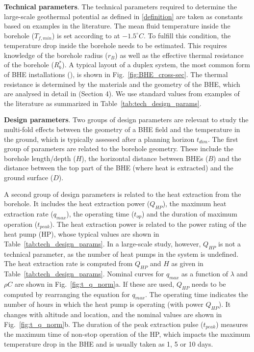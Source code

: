 \textbf{Technical parameters}. The technical parameters required to determine the large-scale geothermal potential as defined in \ref{definition} are taken as constants based on examples in the literature. The mean fluid temperature inside the borehole ($T_{f, min}$) is set according to \citet{sia_sondes_2010} at $-1.5^\circ C$. To fulfill this condition, the temperature drop inside the borehole needs to be estimated. This requires knowledge of the borehole radius ($r_B$) as well as the effective thermal resistance of the borehole ($R_b^*$). A typical layout of a duplex system, the most common form of BHE installations (\cite{sia_sondes_2010}), is shown in Fig.~\ref{fig:BHE_cross-sec}. The thermal resistance is determined by the materials and the geometry of the BHE, which are analysed in detail in \citep{huber_erdwarmesonden_2005} (Section 4). We use standard values from examples of the literature as summarized in Table~\ref{tab:tech_design_params}.

\textbf{Design parameters}. Two groups of design parameters are relevant to study the multi-fold effects between the geometry of a BHE field and the temperature in the ground, which is typically assessed after a planning horizon $t_{dim}$. 
The first group of parameters are related to the borehole geometry. These include the borehole length/depth ($H$), the horizontal distance between BHEs ($B$) and the distance between the top part of the BHE (where heat is extracted) and the ground surface ($D$). 

A second group of design parameters is related to the heat extraction from the borehole. It includes the heat extraction power ($Q_{HP}$), the maximum heat extraction rate ($q_{max}$), the operating time ($t_{op}$) and the duration of maximum operation ($t_{peak}$). The heat extraction power is related to the power rating of the heat pump (HP), whose typical values are shown in Table~\ref{tab:tech_design_params}. In a large-scale study, however, $Q_{HP}$ is not a technical parameter, as the number of heat pumps in the system is undefined. The heat extraction rate is computed from $Q_{HP}$ and $H$ as given in Table~\ref{tab:tech_design_params}. Nominal curves for $q_{max}$ as a function of $\lambda$ and $\rho C$ are shown in Fig.~\ref{fig:t_q_norm}a. If these are used, $Q_{HP}$ needs to be computed by rearranging the equation for $q_{max}$. The operating time indicates the number of hours in which the heat pump is operating (with power $Q_{HP}$). It changes with altitude and location, and the nominal values are shown in Fig.~\ref{fig:t_q_norm}b. The duration of the peak extraction pulse ($t_{peak}$) measures the maximum time of non-stop operation of the HP, which impacts the maximum temperature drop in the BHE and is usually taken as 1, 5 or 10 days.

